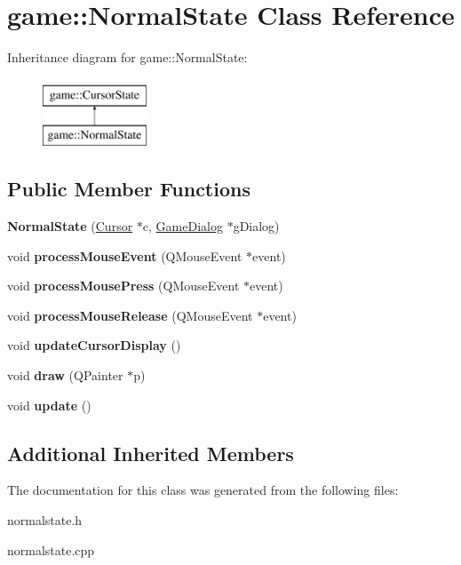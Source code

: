 \hypertarget{classgame_1_1NormalState}{}\section{game\+:\+:Normal\+State Class Reference}
\label{classgame_1_1NormalState}
Inheritance diagram for game\+:\+:Normal\+State\+:\begin{figure}[H]
\begin{center}
\leavevmode
\includegraphics[height=2.000000cm]{classgame_1_1NormalState}
\end{center}
\end{figure}
\subsection*{Public Member Functions}
\begin{DoxyCompactItemize}
\item 
\mbox{\label{classgame_1_1NormalState_aa62668ebf4796000df8d0ac13881059a}} 
{\bfseries Normal\+State} (\hyperlink{classgame_1_1Cursor}{Cursor} $\ast$c, \hyperlink{classgame_1_1GameDialog}{Game\+Dialog} $\ast$g\+Dialog)
\item 
\mbox{\label{classgame_1_1NormalState_aab1f97ad9dbdbd2a22a777ac2008292b}} 
void {\bfseries process\+Mouse\+Event} (Q\+Mouse\+Event $\ast$event)
\item 
\mbox{\label{classgame_1_1NormalState_ae4409bfac9558b3b9a70ca8be8f9ecb9}} 
void {\bfseries process\+Mouse\+Press} (Q\+Mouse\+Event $\ast$event)
\item 
\mbox{\label{classgame_1_1NormalState_a8efa205e3ae635b2cf302e03e85ada2d}} 
void {\bfseries process\+Mouse\+Release} (Q\+Mouse\+Event $\ast$event)
\item 
\mbox{\label{classgame_1_1NormalState_a2aa40d550877101c1a0ceaf66a989c94}} 
void {\bfseries update\+Cursor\+Display} ()
\item 
\mbox{\label{classgame_1_1NormalState_aeeeac9fc5333b16f8b99fa0b3b78be3d}} 
void {\bfseries draw} (Q\+Painter $\ast$p)
\item 
\mbox{\label{classgame_1_1NormalState_a98dad4f3e4a58fd019b12b103ad6a749}} 
void {\bfseries update} ()
\end{DoxyCompactItemize}
\subsection*{Additional Inherited Members}


The documentation for this class was generated from the following files\+:\begin{DoxyCompactItemize}
\item 
normalstate.\+h\item 
normalstate.\+cpp\end{DoxyCompactItemize}

